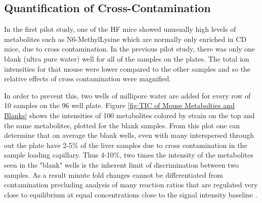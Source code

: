 \documentclass[a4paper]{book}
\begin{document}
	\subsection*{Quantification of Cross-Contamination }
	
	In the first pilot study, one of the HF mice showed unusually high levels of metabolites such as N6-MethylLysine which are normally only enriched in CD mice, due to cross contamination. In the previous pilot study, there was only one blank (ultra pure water) well for all of the samples on the plates. The total ion intensities for that mouse were lower compared to the other samples and so the relative effects of cross contamination were magnified. 
	
	In order to prevent this, two wells of millipore water are added for every row of 10 samples on the 96 well plate. Figure \ref{fig:TIC of Mouse Metabolties and Blanks} shows the intensities of 100 metabolites colored by strain on the top and the same metabolites, plotted for the blank samples. From this plot one can determine that on average the blank wells, even with many interspersed through out the plate have 2-5\% of the liver samples due to cross contamination in the sample loading capillary. Thus 4-10\%, two times the intensity of the metabolites seen in the "blank" wells is the inherent limit of discrimination between two samples. As a result minute fold changes cannot be differentiated from contamination precluding analysis of many reaction ratios that are regulated very close to equilibrium at equal concentrations close to the signal intensity baseline \citep{VanEunen2010,Traut1994,Beard2002,Schellenberger2010}.
	
\end{document}
